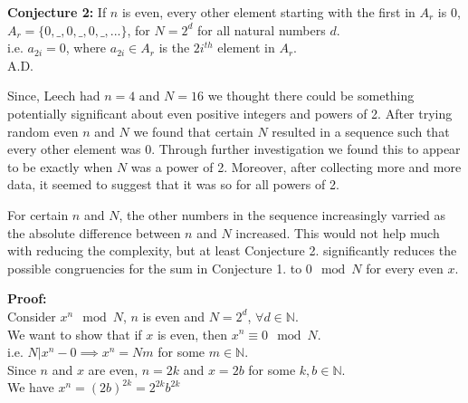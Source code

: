 \documentclass{article}
\begin{document}
\begin{flushleft}
\vspace{.1in}

{\bf Conjecture 2:} If $n$ is even, every other element starting with the first in $A_r$ is $0$, $A_r=\{0,\_,0,\_,0,\_,...\}$, for $N=2^d$ for all natural numbers $d$. \\
    \hspace{.2in} i.e. $a_{2i}=0$, where $a_{2i}\in A_r$ is the $2i^{th}$ element in $A_r$. \\
    \hspace{4.3in} A.D.

    Since, Leech \cite{leech} had $n=4$ and $N=16$ we thought there could be something potentially significant about even positive integers and powers of 2. After trying random even $n$ and $N$ we found that certain $N$ resulted in a sequence such that every other element was 0. Through further investigation we found this to appear to be exactly when $N$ was a power of 2. Moreover, after collecting more and more data, it seemed to suggest that it was so for all powers of 2.

    \vspace{.1in}

    For certain $n$ and $N$, the other numbers in the sequence increasingly varried as the absolute difference between $n$ and $N$ increased. This  would not help much with reducing the complexity, but at least Conjecture 2. significantly reduces the possible congruencies for the sum in Conjecture 1. to $0\mod N$ for every even $x$.

    \vspace{.1in}

    {\bf Proof:}\\
    Consider $x^n\mod N$, $n$ is even and $N=2^d$, $\forall d\in {\mathbb{N}}$.\\
    We want to show that if $x$ is even, then $x^n\equiv 0 \mod N$.\\
    \hspace{.2in} i.e. $N|x^n-0 \implies  x^n=Nm$ for some $m\in{\mathbb{N}}$.\\
    Since $n$ and $x$ are even, $n=2k$ and $x=2b$ for some $k,b\in{\mathbb{N}}$.\\
    We have $x^n=(2b)^{2k}=2^{2k}b^{2k}$


    \vspace{.1in}


\end{flushleft}
\end{document}
